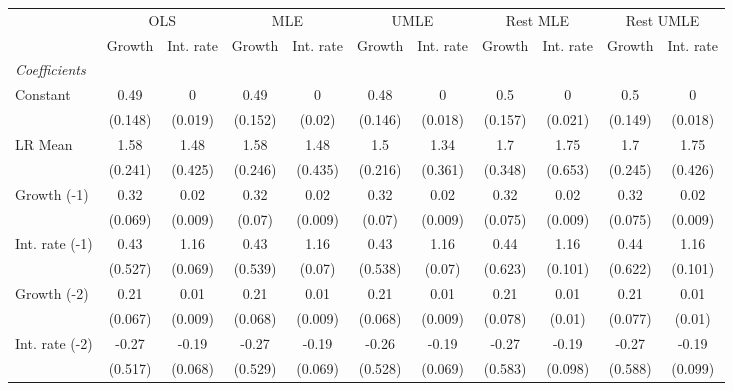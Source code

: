 \begin{table}[htbp] 
	\centering
	\begin{tabular}{@{\extracolsep{4pt}}lcccccccccc@{}}		\hline\hline
		 		 & \multicolumn{2}{c}{OLS} &\multicolumn{2}{c}{MLE} &\multicolumn{2}{c}{UMLE} &\multicolumn{2}{c}{Rest MLE} &\multicolumn{2}{c}{Rest UMLE} \\ 
 		 & Growth 	 & Int. rate 	 & Growth 	 & Int. rate 	 & Growth 	 & Int. rate 	 & Growth 	 & Int. rate 	 & Growth 	 & Int. rate\\\cline{2-3}\cline{4-5}\cline{6-7}\cline{8-9}\cline{10-11}
\rule{0pt}{4ex} 
 \emph{Coefficients} 	  		 & 		 & 		 & 		 & 		 & 		 & 		 & 		 & 		 & 		 &\\ 
\quad Constant 	 & 0.49 	 & 0 	 & 0.49 	 & 0 	 & 0.48 	 & 0 	 & 0.5 	 & 0 	 & 0.5 	 & 0	 \\ 
 		 & (0.148) 	 & (0.019) 	 & (0.152) 	 & (0.02) 	 & (0.146) 	 & (0.018) 	 & (0.157) 	 & (0.021) 	 & (0.149) 	 & (0.018) 	 \\ 
\quad LR Mean 	 & 1.58 	 & 1.48 	 & 1.58 	 & 1.48 	 & 1.5 	 & 1.34 	 & 1.7 	 & 1.75 	 & 1.7 	 & 1.75	 \\ 
 		 & (0.241) 	 & (0.425) 	 & (0.246) 	 & (0.435) 	 & (0.216) 	 & (0.361) 	 & (0.348) 	 & (0.653) 	 & (0.245) 	 & (0.426) 	 \\ 
\quad Growth (-1) 	 &0.32 	 & 0.02 	 & 0.32 	 & 0.02 	 & 0.32 	 & 0.02 	 & 0.32 	 & 0.02 	 & 0.32 	 & 0.02	 \\ 
 		 & (0.069) 	 & (0.009) 	 & (0.07) 	 & (0.009) 	 & (0.07) 	 & (0.009) 	 & (0.075) 	 & (0.009) 	 & (0.075) 	 & (0.009) 	 \\ 
\quad Int. rate (-1) 	 &0.43 	 & 1.16 	 & 0.43 	 & 1.16 	 & 0.43 	 & 1.16 	 & 0.44 	 & 1.16 	 & 0.44 	 & 1.16	 \\ 
 		 & (0.527) 	 & (0.069) 	 & (0.539) 	 & (0.07) 	 & (0.538) 	 & (0.07) 	 & (0.623) 	 & (0.101) 	 & (0.622) 	 & (0.101) 	 \\ 
\quad Growth (-2) 	 &0.21 	 & 0.01 	 & 0.21 	 & 0.01 	 & 0.21 	 & 0.01 	 & 0.21 	 & 0.01 	 & 0.21 	 & 0.01	 \\ 
 		 & (0.067) 	 & (0.009) 	 & (0.068) 	 & (0.009) 	 & (0.068) 	 & (0.009) 	 & (0.078) 	 & (0.01) 	 & (0.077) 	 & (0.01) 	 \\ 
\quad Int. rate (-2) 	 &-0.27 	 & -0.19 	 & -0.27 	 & -0.19 	 & -0.26 	 & -0.19 	 & -0.27 	 & -0.19 	 & -0.27 	 & -0.19	 \\ 
 		 & (0.517) 	 & (0.068) 	 & (0.529) 	 & (0.069) 	 & (0.528) 	 & (0.069) 	 & (0.583) 	 & (0.098) 	 & (0.588) 	 & (0.099) 	 \\ 

\end{tabular}
\end{table}

